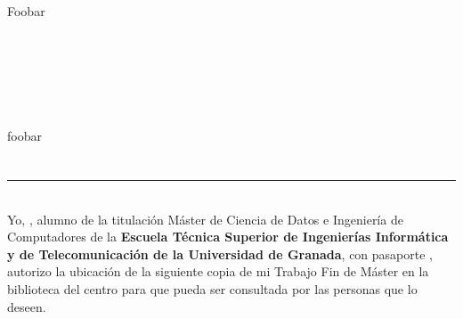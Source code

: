 \chapter*{}


%



\thispagestyle{empty}

\begin{center}
{\small \bfseries \myTitle}
\end{center}
\begin{center}
\myName
\end{center}



Foobar
\cleardoublepage


\thispagestyle{empty}


\begin{center}
{\large\bfseries \myTitleENG} \\
\end{center}
\begin{center}
\myName \\
\end{center}

\vspace{0.7cm}
 \\

\vspace{0.7cm}
 \\

foobar
\chapter*{}
\thispagestyle{empty}

\noindent\rule[-1ex]{\textwidth}{2pt}\\[4.5ex]

Yo, \textbf{\myName}, alumno de la titulación Máster de Ciencia de Datos e Ingeniería de Computadores de la \textbf{Escuela Técnica Superior
de Ingenierías Informática y de Telecomunicación de la Universidad de Granada}, con pasaporte \myDNI, autorizo la
ubicación de la siguiente copia de mi Trabajo Fin de Máster en la biblioteca del centro para que pueda ser
consultada por las personas que lo deseen.

